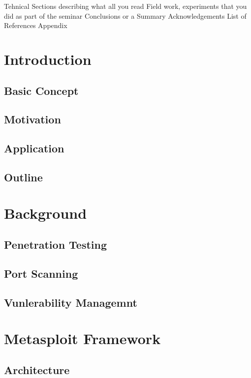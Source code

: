 \documentclass[11pt, a4paper]{report}
\begin{document}
\pagestyle{plain}
\def\title{Metasploit Framework}
\def\what{Seminar}
\def\who{Saurabh Jambhule}
\def\guide{Prof. Sivakumar G. }

\titlpage
\tableofcontents
\listoffigures


\newpage
{}


Tehnical Sections describing what all you read
Field work, experiments that you did as part of the seminar Conclusions or a Summary
Acknowledgements
List of References
Appendix


\chapter{Introduction}
\section{Basic Concept}
\section{Motivation}
\section{Application}
\section{Outline}


\chapter{Background}
\section{Penetration Testing}
\section{Port Scanning}
\section{Vunlerability Managemnt}

\chapter{Metasploit Framework}
\section{Architecture}
\end{document}
